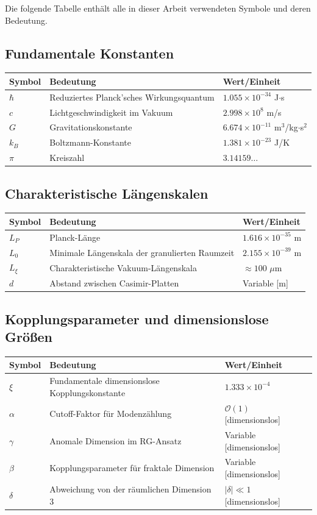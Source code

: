 	Die folgende Tabelle enthält alle in dieser Arbeit verwendeten Symbole und deren Bedeutung.
	
	\subsection{Fundamentale Konstanten}
	\begin{longtable}{p{1cm} p{8cm} p{3cm}}
		\toprule
		\textbf{Symbol} & \textbf{Bedeutung} & \textbf{Wert/Einheit} \\
		\midrule
		$\hbar$ & Reduziertes Planck'sches Wirkungsquantum & $1.055 \times 10^{-34}$ J$\cdot$s \\
		$c$ & Lichtgeschwindigkeit im Vakuum & $2.998 \times 10^8$ m/s \\
		$G$ & Gravitationskonstante & $6.674 \times 10^{-11}$ m$^3$/kg$\cdot$s$^2$ \\
		$k_B$ & Boltzmann-Konstante & $1.381 \times 10^{-23}$ J/K \\
		$\pi$ & Kreiszahl & $3.14159\ldots$ \\
		\bottomrule
	\end{longtable}
	
	\subsection{Charakteristische Längenskalen}
	\begin{longtable}{p{2cm} p{8cm} p{3cm}}
		\toprule
		\textbf{Symbol} & \textbf{Bedeutung} & \textbf{Wert/Einheit} \\
		\midrule
		$L_P$ & Planck-Länge & $1.616 \times 10^{-35}$ m \\
		$L_0$ & Minimale Längenskala der granulierten Raumzeit & $2.155 \times 10^{-39}$ m \\
		$L_\xi$ & Charakteristische Vakuum-Längenskala & $\approx 100$ $\mu$m \\
		$d$ & Abstand zwischen Casimir-Platten & Variable [m] \\
		\bottomrule
	\end{longtable}
	
	\subsection{Kopplungsparameter und dimensionslose Größen}
	\begin{longtable}{p{2cm} p{8cm} p{3cm}}
		\toprule
		\textbf{Symbol} & \textbf{Bedeutung} & \textbf{Wert/Einheit} \\
		\midrule
		$\xi$ & Fundamentale dimensionslose Kopplungskonstante & $1.333 \times 10^{-4}$ \\
		$\alpha$ & Cutoff-Faktor für Modenzählung & $\mathcal{O}(1)$ [dimensionslos] \\
		$\gamma$ & Anomale Dimension im RG-Ansatz & Variable [dimensionslos] \\
		$\beta$ & Kopplungsparameter für fraktale Dimension & Variable [dimensionslos] \\
		$\delta$ & Abweichung von der räumlichen Dimension 3 & $|\delta| \ll 1$ [dimensionslos] \\
		\bottomrule
	\end{longtable}
	
